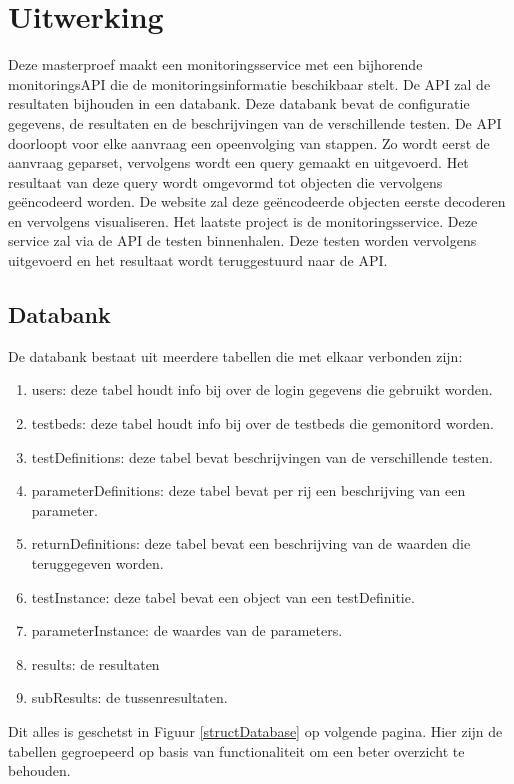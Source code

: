 \chapter{Uitwerking}
{\samenvatting Deze masterproef maakt een monitoringsservice met een bijhorende monitoringsAPI die de monitoringsinformatie beschikbaar stelt. De API zal de resultaten bijhouden in een databank. Deze databank bevat de configuratie gegevens, de resultaten en de beschrijvingen van de verschillende testen. De API doorloopt voor elke aanvraag een opeenvolging van stappen. Zo wordt eerst de aanvraag geparset, vervolgens wordt een query gemaakt en uitgevoerd. Het resultaat van deze query wordt omgevormd tot objecten die vervolgens ge\"encodeerd worden. De website zal deze ge\"encodeerde objecten eerste decoderen en vervolgens visualiseren. Het laatste project is de monitoringsservice. Deze service zal via de API de testen binnenhalen. Deze testen worden vervolgens uitgevoerd en het resultaat wordt teruggestuurd naar de API.}
\section{Databank}
\npar
De databank bestaat uit meerdere tabellen die met elkaar verbonden zijn:
\begin{enumerate}
\item users: deze tabel houdt info bij over de login gegevens die gebruikt worden.
\item testbeds: deze tabel houdt info bij over de testbeds die gemonitord worden.
\item testDefinitions: deze tabel bevat beschrijvingen van de verschillende testen.
\item parameterDefinitions: deze tabel bevat per rij een beschrijving van een parameter.
\item returnDefinitions: deze tabel bevat een beschrijving van de waarden die teruggegeven worden. 
\clearpage
\item testInstance: deze tabel bevat een object van een testDefinitie.
\item parameterInstance: de waardes van de parameters.
\item results: de resultaten
\item subResults: de tussenresultaten.
\end{enumerate}
\npar
Dit alles is geschetst in Figuur \ref{structDatabase} op volgende pagina. Hier zijn de tabellen gegroepeerd op basis van functionaliteit om een beter overzicht te behouden.
\clearpage
